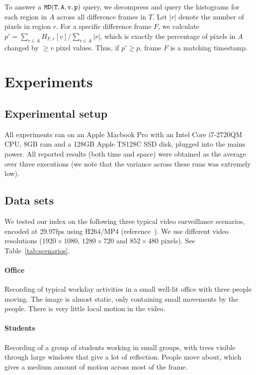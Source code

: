 To answer a $\mathtt{MD(T, A, v, p)}$ query, we decompress and query the histograms for each region in $A$ across all difference frames in $T$. Let $|r|$ denote the number of pixels in region $r$. For a specific difference frame $F$, we calculate $p' = \sum_{r \in A} H_{F,r}[v] / \sum_{r \in A} |r|$, which is exactly the percentage of pixels in $A$ changed by $\geq v$ pixel values. Thus, if $p' \geq p$, frame $F$ is a matching timestamp.


\section{Experiments}

\subsection{Experimental setup}
All experiments ran on an Apple Macbook Pro with an Intel Core i7-2720QM CPU, 8GB ram and a 128GB Apple TS128C SSD disk, plugged into the mains power. All reported results (both time and space) were obtained as the average over three executions (we note that the variance across these runs was extremely low).

\subsection{Data sets}
We tested our index on the following three typical video surveillance scenarios, encoded at 29.97fps using H264/MP4 (reference~\cite{sourcecode}). We use different video resolutions ($1920\times1080$, $1280\times720$ and $852\times480$ pixels). See Table~\ref{tab:scenarios}.

\paragraph{Office}
Recording of typical workday activities in a small well-lit office with three people moving. The image is almost static, only containing small movements by the people. There is very little local motion in the video.

\paragraph{Students}
Recording of a group of students working in small groups, with trees visible through large windows that give a lot of reflection. People move about, which gives a medium amount of motion across most of the frame.

